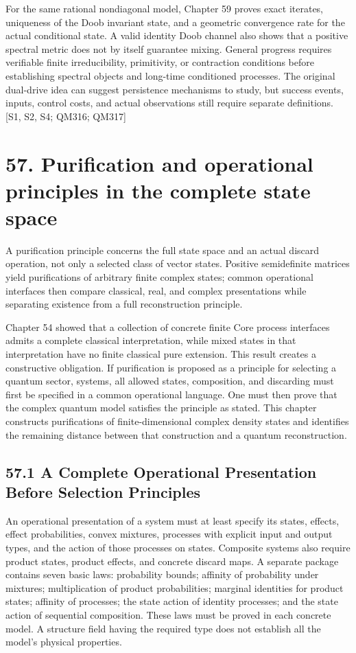 \documentclass[
  11pt,
  oneside]{book}
\begin{document}
For the same rational nondiagonal model, Chapter 59 proves exact
iterates, uniqueness of the Doob invariant state, and a geometric
convergence rate for the actual conditional state. A valid identity Doob
channel also shows that a positive spectral metric does not by itself
guarantee mixing. General progress requires verifiable finite
irreducibility, primitivity, or contraction conditions before
establishing spectral objects and long-time conditioned processes. The
original dual-drive idea can suggest persistence mechanisms to study,
but success events, inputs, control costs, and actual observations still
require separate definitions. {[}S1, S2, S4; QM316; QM317{]}

\chapter{57. Purification and operational principles in the complete
state space}\label{ch-57}

A purification principle concerns the full state space and an actual
discard operation, not only a selected class of vector states. Positive
semidefinite matrices yield purifications of arbitrary finite complex
states; common operational interfaces then compare classical, real, and
complex presentations while separating existence from a full
reconstruction principle.

Chapter 54 showed that a collection of concrete finite Core process
interfaces admits a complete classical interpretation, while mixed
states in that interpretation have no finite classical pure extension.
This result creates a constructive obligation. If purification is
proposed as a principle for selecting a quantum sector, systems, all
allowed states, composition, and discarding must first be specified in a
common operational language. One must then prove that the complex
quantum model satisfies the principle as stated. This chapter constructs
purifications of finite-dimensional complex density states and
identifies the remaining distance between that construction and a
quantum reconstruction.

\section{57.1 A Complete Operational Presentation Before Selection
Principles}

An operational presentation of a system must at least specify its
states, effects, effect probabilities, convex mixtures, processes with
explicit input and output types, and the action of those processes on
states. Composite systems also require product states, product effects,
and concrete discard maps. A separate package contains seven basic laws:
probability bounds; affinity of probability under mixtures;
multiplication of product probabilities; marginal identities for product
states; affinity of processes; the state action of identity processes;
and the state action of sequential composition. These laws must be
proved in each concrete model. A structure field having the required
type does not establish all the model's physical properties.
\end{document}
